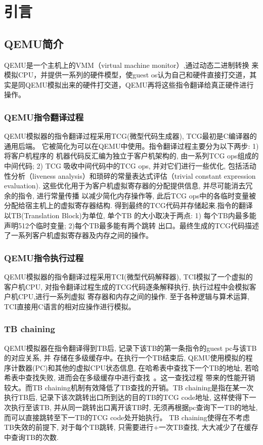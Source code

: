 \chapter{引言}
\label{cha:intro}

\section{QEMU简介}
    QEMU是一个主机上的VMM（virtual machine monitor）,通过动态二进制转换
    来模拟CPU，并提供一系列的硬件模型，使guest os认为自己和硬件直接打交道，其
    实是同QEMU模拟出来的硬件打交道，QEMU再将这些指令翻译给真正硬件进行操作。

\subsection{QEMU指令翻译过程}
    QEMU模拟器的指令翻译过程采用TCG(微型代码生成器), TCG最初是C编译器的通用后端。
    它被简化为可以在QEMU中使用。指令翻译过程主要分为以下两步: 1) 将客户机程序的
    机器代码反汇编为独立于客户机架构的, 由一系列TCG ops组成的中间代码; 2) TCG
    吸收中间代码中的TCG ops, 并对它们进行一些优化, 包括活动性分析（liveness
    analysis）和琐碎的常量表达式评估（trivial constant expression evaluation).
    这些优化用于为客户机虚拟寄存器的分配提供信息, 并尽可能消去冗余的指令, 进行常量传播
    以减少简化内存操作等, 此后TCG ops中的各临时变量被分配给宿主机上的虚拟寄存器结构.
     得到最终的TCG代码并存储起来.指令的翻译以TB(Translation Block)为单位, 单个TB
     的大小取决于两点: 1) 每个TB内最多能声明512个临时变量; 2)每个TB最多能有两个跳转
     出口。最终生成的TCG代码描述了一系列客户机虚拟寄存器及内存之间的操作。

\subsection{QEMU指令执行过程}
    QEMU模拟器的指令翻译过程采用TCI(微型代码解释器), TCI模拟了一个虚拟的客户机CPU,
    对指令翻译过程生成的TCG代码逐条解释执行, 执行过程中会模拟客户机CPU,进行一系列虚拟
    寄存器和内存之间的操作. 至于各种逻辑与算术运算, TCI直接用C语言的相对应操作进行模拟。

\subsection{TB chaining}
    QEMU模拟器在指令翻译得到TB后, 记录下该TB的第一条指令的guest pc与该TB的对应关系, 并
    存储在多级缓存中。在执行一个TB结束后, QEMU使用模拟的程序计数器(PC)和其他的虚拟CPU状态信息,
    在哈希表中查找下一个TB的地址, 若哈希表中查找失败, 进而会在多级缓存中进行查找~\cite{qemuBellard05}。这一查找过程
    带来的性能开销较大。而TB chaining机制有效降低了TB查找的开销。TB chaining是指在某一次
    执行TB后, 记录下该次跳转出口所到达的目的TB的TCG code地址, 这样使得下一次执行至该TB,
    并从同一跳转出口离开该TB时, 无须再根据pc查询下一TB的地址, 而可以直接跳转至下一TB的TCG code处开始执行。
    TB chaining使得在不考虑TB失效的前提下, 对于每个TB跳转, 只需要进行+一次TB查找, 大大减少了在缓存中查询TB的次数.


